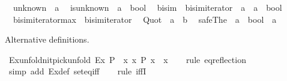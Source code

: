 \begin{isabellebody}
\isanewline
{}\isamarkupfalse%
\isanewline
\ \ unknown\ {\isacharcolon}{\kern0pt}{\isacharcolon}{\kern0pt}\ {\isacharprime}{\kern0pt}a\isanewline
\ \ is{\isacharunderscore}{\kern0pt}unknown\ {\isacharcolon}{\kern0pt}{\isacharcolon}{\kern0pt}\ {\isachardoublequoteopen}{\isacharprime}{\kern0pt}a\ {\isasymRightarrow}\ bool{\isachardoublequoteclose}\isanewline
\ \ bisim\ {\isacharcolon}{\kern0pt}{\isacharcolon}{\kern0pt}\ {\isachardoublequoteopen}bisim{\isacharunderscore}{\kern0pt}iterator\ {\isasymRightarrow}\ {\isacharprime}{\kern0pt}a\ {\isasymRightarrow}\ {\isacharprime}{\kern0pt}a\ {\isasymRightarrow}\ bool{\isachardoublequoteclose}\isanewline
\ \ bisim{\isacharunderscore}{\kern0pt}iterator{\isacharunderscore}{\kern0pt}max\ {\isacharcolon}{\kern0pt}{\isacharcolon}{\kern0pt}\ bisim{\isacharunderscore}{\kern0pt}iterator\isanewline
\ \ Quot\ {\isacharcolon}{\kern0pt}{\isacharcolon}{\kern0pt}\ {\isachardoublequoteopen}{\isacharprime}{\kern0pt}a\ {\isasymRightarrow}\ {\isacharprime}{\kern0pt}b{\isachardoublequoteclose}\isanewline
\ \ safe{\isacharunderscore}{\kern0pt}The\ {\isacharcolon}{\kern0pt}{\isacharcolon}{\kern0pt}\ {\isachardoublequoteopen}{\isacharparenleft}{\kern0pt}{\isacharprime}{\kern0pt}a\ {\isasymRightarrow}\ bool{\isacharparenright}{\kern0pt}\ {\isasymRightarrow}\ {\isacharprime}{\kern0pt}a{\isachardoublequoteclose}%
\begin{isamarkuptext}%
Alternative definitions.%
\end{isamarkuptext}\isamarkuptrue%
\isamarkupfalse%
\ Ex{}{\isacharunderscore}{\kern0pt}unfold{\isacharbrackleft}{\kern0pt}nitpick{\isacharunderscore}{\kern0pt}unfold{\isacharbrackright}{\kern0pt}{\isacharcolon}{\kern0pt}\ {\isachardoublequoteopen}Ex{}\ P\ {\isasymequiv}\ {\isasymexists}x{\isachardot}{\kern0pt}\ {\isacharbraceleft}{\kern0pt}x{\isachardot}{\kern0pt}\ P\ x{\isacharbraceright}{\kern0pt}\ {\isacharequal}{\kern0pt}\ {\isacharbraceleft}{\kern0pt}x{\isacharbraceright}{\kern0pt}{\isachardoublequoteclose}\isanewline
%
\isadelimproof
\ \ %
\endisadelimproof
%
\isatagproof
{}\isamarkupfalse%
\ {\isacharparenleft}{\kern0pt}rule\ eq{\isacharunderscore}{\kern0pt}reflection{\isacharparenright}{\kern0pt}\isanewline
\ \ \isamarkupfalse%
\ {\isacharparenleft}{\kern0pt}simp\ add{\isacharcolon}{\kern0pt}\ Ex{}{\isacharunderscore}{\kern0pt}def\ set{\isacharunderscore}{\kern0pt}eq{\isacharunderscore}{\kern0pt}iff{\isacharparenright}{\kern0pt}\isanewline
\ \ \isamarkupfalse%
\ {\isacharparenleft}{\kern0pt}rule\ iffI{\isacharparenright}{\kern0pt}\isanewline

\end{isabellebody}
